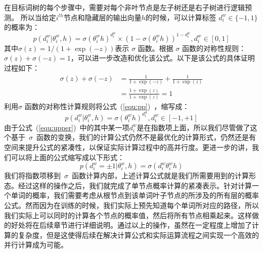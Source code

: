 在目标词树的每个步骤中，需要对每个非叶节点是左子树还是右子树进行逻辑预测。 所以当给定$ i^{th} $节点和隐藏层的输出向量$h$的时候，可以计算标签 $d^w_i\in \{-1,1\}$的概率为：
 \begin{equation}\label{equ:pp}
p(d^w_i|\theta_{i}^w,h) =\sigma(\theta_{i}^w h)^{d_i^w}\times(1-\sigma(\theta_{i}^w h))^{1-{d_i^w}},d_i^w \in [0,1]
\end{equation}
其中$ \sigma(z)= 1 /(1 + \exp(-z))$表示 $\sigma$ 函数。根据 $\sigma$ 函数的对称性规则：$\sigma(z)+ \sigma(-z)=1$，可以进一步改造和优化该公式。以下是该公式的具体证明过程如下：
\begin{equation}\label{equ:sig}
\begin{split}
\sigma(z)+ \sigma(-z)  &=\frac{1}{1 + \exp(-z)}+\frac{1}{1 + \exp(z)}\\
  &=\frac{1 + \exp(z)}{1 + \exp(z)}=1
\end{split}
\end{equation}
利用$\sigma$ 函数的对称性计算规则将公式~(\ref{equ:pp})~，缩写成：
 \begin{equation}\label{equ:upper}
p(d^w_i|\theta_{i}^w,h) =\sigma(\theta_{i}^w h)^{d_i^w}, d_i^w \in [-1,+1]
\end{equation}
由于公式~(\ref{equ:upper})~中的其中某一项${d_i^w}$是在指数项上面，所以我们尽管做了这个基于~$\sigma$~函数的变换，我们的计算公式仍然不是最优化的计算形式，仍然还是有空间来提升公式的紧凑性，以保证实际计算过程中的高并行度。更进一步的讲，我们可以将上面的公式缩写成以下形式：
\begin{equation}
p(d^w_i=\pm 1|\theta_{i}^w,h) = \sigma({d_i^w}\theta_{i}^w h)
\end{equation}
我们将指数项移到~$\sigma$~函数计算内部，上述计算公式就是我们所需要用到的计算形态。经过这样的操作之后，我们就完成了单节点概率计算的紧凑表示。针对计算一个单词的概率，我们需要考虑从根节点到该单词叶子节点的所涉及的所有层的概率公式。然而因为在训练的时候，我们实际上预先知道每个单词所对应的路径，所以我们实际上可以同时的计算各个节点的概率值，然后将所有节点相乘起来。这样做的好处将在后续章节进行详细说明。通过以上的操作，虽然在一定程度上增加了计算的复杂度，但是这使得后续在解决计算公式和实际运算流程之间实现一个高效的并行计算成为可能。

